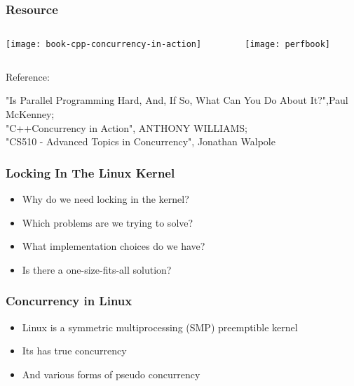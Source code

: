 \begin{frame}
    \frametitle{Resource}
    
    
    

	\begin{columns}
    
    \begin{column}{.5\textwidth}
        \centering
        
        \texttt{[image: book-cpp-concurrency-in-action]}
        
    \end{column}
    
    \begin{column}{.5\textwidth}
        
      \texttt{[image: perfbook]}
       
        
    \end{column}
    
    
\end{columns}
    
    \tiny Reference:
    
    "Is Parallel Programming Hard, And, If So, What Can You Do About It?",Paul McKenney;\\
    "C++Concurrency in Action", ANTHONY WILLIAMS; \\
    "CS510 - Advanced Topics in Concurrency", Jonathan Walpole 
\end{frame}

\begin{frame}[fragile]
    \frametitle{Locking In The Linux Kernel}
    \Large
    \begin{itemize}
    \item Why do we need locking in the kernel?
    \item Which problems are we trying to solve?
    \item What implementation choices do we have?
    \item Is there a one-size-fits-all solution?
  
\end{itemize}
    
\end{frame}


\begin{frame}[fragile]
    \frametitle{Concurrency in Linux}
    \Large
    \begin{itemize}
        \item Linux is a symmetric multiprocessing (SMP)
        preemptible kernel
        
        \item Its has true concurrency
        
        \item And various forms of pseudo concurrency
        
        
    \end{itemize}
    
\end{frame}


